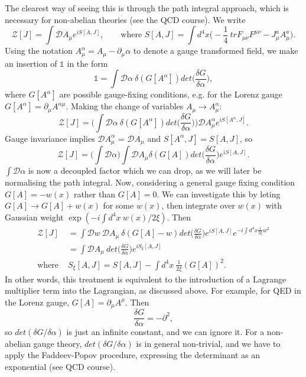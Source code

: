 The clearest way of seeing this is through the path integral approach, which is necessary for non-abelian theories (see the QCD course). We write 
\begin{equation}
\mathcal{Z}[J] = \int\mathcal{D} A_\mu e^{iS[A,J]}, \qquad \text{where } S[A,J] = \int d^4x \bigg(-\frac{1}{4}\ tr F_{\mu \nu}F^{\mu \nu} - J_\mu^a A_\mu^a \bigg).
\end{equation}
Using the notation $A_\mu^\alpha = A_\mu - \partial_\mu \alpha$ to denote a gauge transformed field, we make an insertion of $\mathds{1}$ in the form
\begin{equation}
\mathds{1} = \int \mathcal{D}\alpha\ \delta ( G[A^\alpha]) det\bigg(\frac{\delta G}{\delta \alpha} \bigg),
\end{equation}
where $G[A^\alpha]$ are possible gauge-fixing conditions, e.g. for the Lorenz gauge $G[A^\alpha] = \partial_\mu A^{\alpha \mu}$. Making the change of variables $A_\mu \to A_\mu^\alpha$:
\begin{equation}
\mathcal{Z}[J] = \bigg( \int \mathcal{D}\alpha\ \delta ( G[A^\alpha]) det\bigg(\frac{\delta G}{\delta \alpha} \bigg)\bigg) \mathcal{D}A^\alpha_\mu e^{i S[A^\alpha,J]}.
\end{equation}
Gauge invariance implies $\mathcal{D}A_\mu^\alpha$ = $\mathcal{D}A_\mu$ and $S[A^\alpha, J] = S[A,J]$, so
\begin{equation}
\mathcal{Z}[J] = \bigg( \int \mathcal{D} \alpha \bigg) \int \mathcal{D} A_\mu \delta(G[A]) det \bigg(\frac{\delta G}{\delta \alpha} \bigg) e^{iS[A,J]}.
\end{equation}
$\int \mathcal{D} \alpha$ is now a decoupled factor which we can drop, as we will later be normalising the path integral. Now, considering a general gauge fixing condition $G[A] = -w(x)$ rather than $G[A] = 0$. We can investigate this by leting $G[A] \to G[A] + w(x)$ for some $w(x)$, then integrate over $w(x)$ with Gaussian weight $\exp(-i\int d^4x \ w(x)/2\xi)$. Then
\begin{equation}
\begin{split}
\mathcal{Z}[J] &= \int \mathcal{D} w\ \mathcal{D} A_\mu \ \delta(G[A] - w) det \bigg(\frac{\delta G}{\delta \alpha}\bigg) e^{i S [A,J]} e^{-i \int d^4x \frac{1}{2\xi}w^2} \\
&= \int \mathcal{D} A_\mu\ det\bigg(\frac{\delta G}{\delta \alpha}\bigg) e^{iS_\xi [A,J]} \\
\text{where } &S_\xi[A,J] = S[A,J] - \int d^4x\ \frac{1}{2\xi} (G[A])^2.
\end{split}
\end{equation}
In other words, this treatment is equivalent to the introduction of a Lagrange multiplier term into the Lagrangian, as discussed above.
For example, for QED in the Lorenz gauge, $G[A] = \partial_\mu A^\mu$. Then 
\begin{equation}
\frac{\delta G}{\delta \alpha} = -\partial^2,
\end{equation}
so $det(\delta G/\delta \alpha)$ is just an infinite constant, and we can ignore it. For a non-abelian gauge theory, $det(\delta G/\delta \alpha)$ is in general non-trivial, and we have to apply the Faddeev-Popov procedure, expressing the determinant as an exponential (see QCD course).

